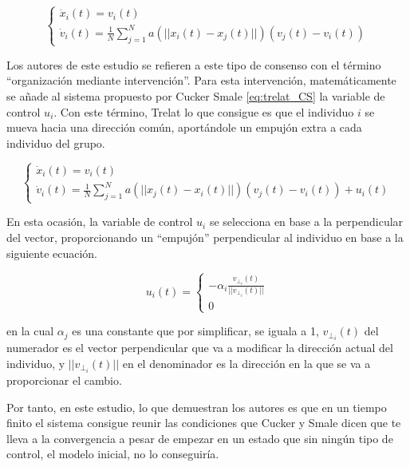 \begin{equation}\label{eq:trelat_CS}
    \left\lbrace
    \begin{array}{ll}
        \dot{x}_{i}(t)=v_{i}(t) \\
        \dot{v}_{i}(t)= \displaystyle{\frac{1}{N}\sum_{j=1}^{N} a(||x_i(t)-x_j(t)||)(v_{j}(t)-v_{i}(t))}
    \end{array}
    \right.
\end{equation}

Los autores de este estudio se refieren a este tipo de consenso con el término ``organización mediante intervención''. Para esta intervención, matemáticamente se añade al sistema propuesto por Cucker Smale \ref{eq:trelat_CS} la variable de control $u_i$. Con este término, Trelat lo que consigue es que el individuo $i$ se mueva hacia una dirección común, aportándole un empujón extra a cada individuo del grupo. 

\begin{equation}\label{eq:CSTrelat_control}
    \left\lbrace
    \begin{array}{l}
        \dot{x}_{i}(t)=v_{i}(t) \\
        \dot{v}_{i}(t)= \displaystyle{\frac{1}{N}\sum_{j=1}^{N}a(||x_{j}(t)-x_{i}(t)||)(v_{j}(t)-v_{i}(t))+u_{i}(t)}
    \end{array}
    \right.
\end{equation}

En esta ocasión, la variable de control $u_i$ se selecciona en base a la perpendicular del vector, proporcionando un ``empujón'' perpendicular al individuo en base a la siguiente ecuación. 

\begin{equation}\label{eq:Trelat_ui}
    u_i(t) = 
    \left\lbrace
    \begin{array}{l}
        \displaystyle{-\alpha_i \frac{v_{\perp_{i}}(t)}{||v_{\perp_{i}}(t)||}} \\
        0
    \end{array}
    \right.
\end{equation}

\noindent en la cual $\alpha_j$ es una constante que por simplificar, se iguala a 1, $v_{\perp_{i}}(t)$ del numerador es el vector perpendicular que va a modificar la dirección actual del individuo, y $||v_{\perp_{i}}(t)||$ en el denominador es la dirección en la que se va a proporcionar el cambio. 

Por tanto, en este estudio, lo que demuestran los autores es que en un tiempo finito el sistema consigue reunir las condiciones que Cucker y Smale dicen que te lleva a la convergencia a pesar de empezar en un estado que sin ningún tipo de control, el modelo inicial, no lo conseguiría.
